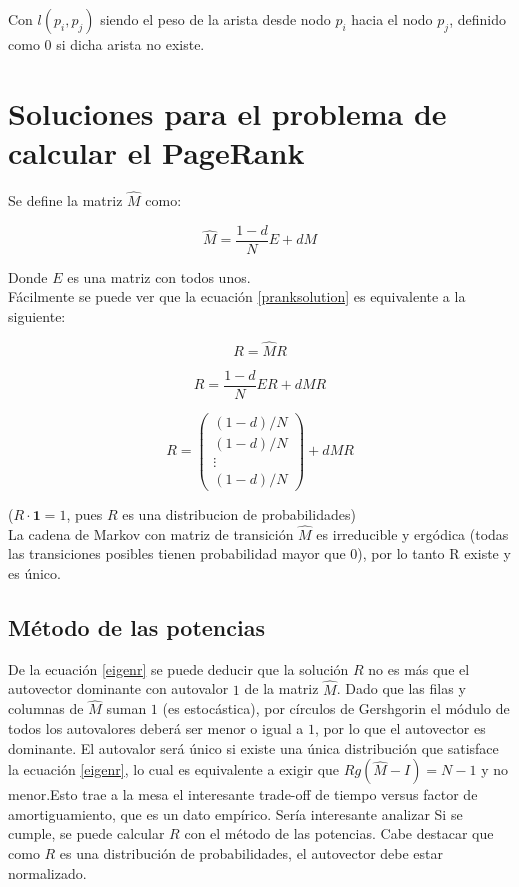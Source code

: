 \documentclass[%
    final,
    notitlepage,
    narroweqnarray,
    inline,
    twoside,
    invited
    ]{ieee}
\begin{document}
Con $l(p_{i},p_{j})$ siendo el peso de la arista desde nodo $p_{i}$ hacia el nodo $p_{j}$, definido como $0$ si dicha arista no existe.\\

\section{Soluciones para el problema de calcular el PageRank}

Se define la matriz $\widehat{M}$ como:

\begin{equation}\label{mhat}
\widehat{M} = \frac{1-d}{N}E + dM
\end{equation}

Donde $E$ es una matriz con todos unos.\\

Fácilmente se puede ver que la ecuación \eqref{pranksolution} es equivalente a la siguiente:

\begin{equation}\label{eigenr}
R = \widehat{M}R
\end{equation}

\[
    R = \frac{1-d}{N}ER + dMR
\]

\[
    R = \begin{pmatrix}
            (1-d)/N \\ (1-d)/N \\ \vdots \\ (1-d)/N
        \end{pmatrix} + dMR
\]

($R \cdot \mathbf 1 = 1$, pues $R$ es una distribucion de probabilidades)\\

La cadena de Markov con matriz de transición $\widehat{M}$ es irreducible y ergódica (todas las transiciones posibles tienen probabilidad mayor
que $0$), por lo tanto R existe y es único.

\subsection{Método de las potencias}

De la ecuación \eqref{eigenr} se puede deducir que la solución $R$ no es más que el autovector dominante con autovalor $1$ de la matriz $\widehat{M}$.
Dado que las filas y columnas de
$\widehat{M}$ suman $1$ (es estocástica), por círculos de Gershgorin el módulo de todos los autovalores deberá ser menor o igual a $1$, por lo que el autovector
es dominante. El autovalor será único si existe una única distribución que satisface la ecuación \eqref{eigenr}, lo cual es equivalente a exigir
que $Rg\left(\widehat{M}-I\right) = N-1$ y no menor.Esto trae a la mesa el interesante trade-off de tiempo versus factor de amortiguamiento, que es un dato empírico. Sería interesante analizar
Si se cumple, se puede calcular $R$ con el método de las potencias. Cabe destacar que como
$R$ es una distribución de probabilidades, el autovector debe estar normalizado.\\
\end{document}
